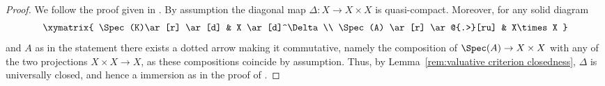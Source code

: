 \begin{proof}
We follow the proof given in \cite[\href{https://stacks.math.columbia.edu/tag/03KV}{Tag\,03KV}]{stacks-project}. By assumption the diagonal map $\Delta:X\to X\times X$ is quasi-compact. Moreover, for any solid diagram
\begin{equation*}
\begin{gathered}
\xymatrix{
\Spec(K)\ar[r] \ar[d] & X \ar[d]^\Delta \\
\Spec(A) \ar[r] \ar@{.>}[ru] & X\times X
}
\end{gathered}
\end{equation*}
and $A$ as in the statement
there exists a dotted arrow making it commutative, namely the composition of $\Spec (A)\to X\times X$ with any of the two projections $X\times X\to X$, as these compositions coincide by assumption. Thus, by Lemma~\ref{rem:valuative criterion closedness}, $\Delta$ is universally closed, and hence a immersion as in the proof of \cite[\href{https://stacks.math.columbia.edu/tag/03KV}{Tag\,03KV}]{stacks-project}. \end{proof}

